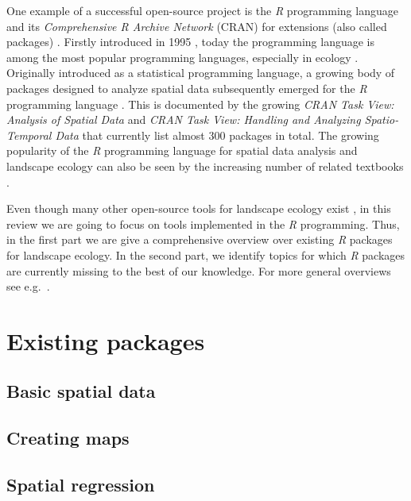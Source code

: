 \documentclass[smallextended]{svjour3}       %
\begin{document}
One example of a successful open-source project is the \emph{R}
programming language and its \emph{Comprehensive R Archive Network}
(CRAN) for extensions (also called packages) \cite{RCoreTeam2019}.
Firstly introduced in 1995 \cite{Smith2016}, today the programming
language is among the most popular programming languages, especially in
ecology \cite{Lai2019}. Originally introduced as a statistical
programming language, a growing body of packages designed to analyze
spatial data subsequently emerged for the \emph{R} programming language
\cite{Bivand2006}. This is documented by the growing \emph{CRAN Task
View: Analysis of Spatial Data} \cite{Bivand2019a} and \emph{CRAN Task
View: Handling and Analyzing Spatio-Temporal Data} \cite{Pebesma2020}
that currently list almost 300 packages in total. The growing popularity
of the \emph{R} programming language for spatial data analysis and
landscape ecology can also be seen by the increasing number of related
textbooks \cite{Fletcher2019,Lovelace2019,Pebesma2019a}.

Even though many other open-source tools for landscape ecology exist
\cite{QGISDevelopmentTeam2016,GRASSDevelopmentTeam2017,Porta2017}, in
this review we are going to focus on tools implemented in the \emph{R}
programming. Thus, in the first part we are give a comprehensive
overview over existing \emph{R} packages for landscape ecology. In the
second part, we identify topics for which \emph{R} packages are
currently missing to the best of our knowledge. For more general
overviews see
e.g.~\cite{Jolma2008,Steiniger2009,Steiniger2009a,Istvan2012}.

\hypertarget{sec:existing_packages}{%
\section{Existing packages}\label{sec:existing_packages}}

\hypertarget{basic-spatial-data}{%
\subsection{Basic spatial data}\label{basic-spatial-data}}

\hypertarget{creating-maps}{%
\subsection{Creating maps}\label{creating-maps}}

\hypertarget{spatial-regression}{%
\subsection{Spatial regression}\label{spatial-regression}}
\end{document}
